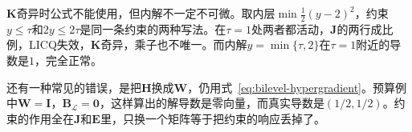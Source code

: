 $\bm{K}$奇异时公式不能使用，但内解不一定不可微。取内层$\min\frac12(y-2)^2$，约束$y\leq\tau$和$2y\leq2\tau$是同一条约束的两种写法。在$\tau=1$处两者都活动，$\bm{J}$的两行成比例，LICQ失效，$\bm{K}$奇异，乘子也不唯一。而内解$y=\min\{\tau,2\}$在$\tau=1$附近的导数是$1$，完全正常。

还有一种常见的错误，是把$\bm{H}$换成$\bm{W}$，仍用式~\eqref{eq:bilevel-hypergradient}。预算例中$\bm{W}=\bm{I}$，$\bm{B}_{\mathcal{L}}=\bm{0}$，这样算出的解导数是零向量，而真实导数是$(1/2,1/2)$。约束的作用全在$\bm{J}$和$\bm{E}$里，只换一个矩阵等于把约束的响应丢掉了。
